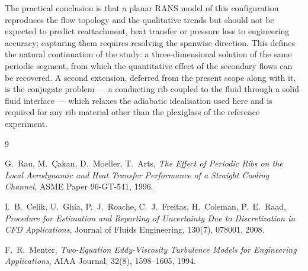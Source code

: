 \documentclass[11pt,a4paper]{article}
\begin{document}
The practical conclusion is that a planar RANS model of this configuration
reproduces the flow topology and the qualitative trends but should not be
expected to predict reattachment, heat transfer or pressure loss to
engineering accuracy; capturing them requires resolving the spanwise
direction. This defines the natural continuation of the study: a
three-dimensional solution of the same periodic segment, from which the
quantitative effect of the secondary flows can be recovered. A second
extension, deferred from the present scope along with it, is the conjugate
problem --- a conducting rib coupled to the fluid through a solid--fluid
interface --- which relaxes the adiabatic idealisation used here and is
required for any rib material other than the plexiglass of the reference
experiment.

\begin{thebibliography}{9}

G.~Rau, M.~\c{C}akan, D.~Moeller, T.~Arts,
\emph{The Effect of Periodic Ribs on the Local Aerodynamic and Heat
Transfer Performance of a Straight Cooling Channel},
ASME Paper 96-GT-541, 1996.

I.~B.~Celik, U.~Ghia, P.~J.~Roache, C.~J.~Freitas, H.~Coleman, P.~E.~Raad,
\emph{Procedure for Estimation and Reporting of Uncertainty Due to
Discretization in CFD Applications},
Journal of Fluids Engineering, 130(7), 078001, 2008.

F.~R.~Menter,
\emph{Two-Equation Eddy-Viscosity Turbulence Models for Engineering
Applications},
AIAA Journal, 32(8), 1598--1605, 1994.

\end{thebibliography}
\end{document}
